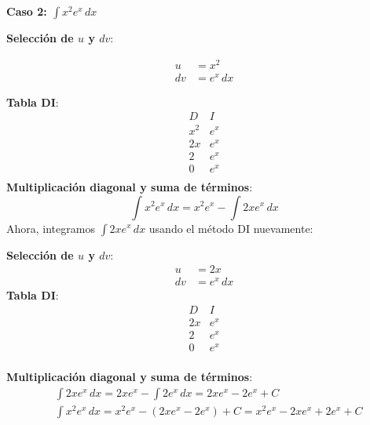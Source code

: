 \begin{example}
    \textbf{Caso 2: \( \int x^2 e^x \, dx \)}
    
    \textbf{Selección de \( u \) y \( dv \)}:
    
    \begin{align*}
    u &= x^2 \\
    dv &= e^x \, dx
    \end{align*}
    
    \textbf{Tabla DI}:
\begin{equation*}
    \begin{array}{c|c}
        D & I \\
        \hline
        x^2 & e^x \\
        2x & e^x \\
        2 & e^x \\
        0 & e^x \\
        \end{array}
\end{equation*}
    \textbf{Multiplicación diagonal y suma de términos}:
\begin{equation*}
    \int x^2 e^x \, dx = x^2 e^x - \int 2x e^x \, dx
\end{equation*}
Ahora, integramos \( \int 2x e^x \, dx \) usando el método DI nuevamente:
    
    \textbf{Selección de \( u \) y \( dv \)}:
    \begin{align*}
    u &= 2x \\
    dv &= e^x \, dx
    \end{align*}
    \textbf{Tabla DI}:
\begin{equation*}
    \begin{array}{c|c}
        D & I \\
        \hline
        2x & e^x \\
        2 & e^x \\
        0 & e^x \\
        \end{array}
\end{equation*}
    
    \textbf{Multiplicación diagonal y suma de términos}:
\begin{align*}
    &\int 2x e^x \, dx = 2x e^x - \int 2 e^x \, dx = 2x e^x - 2e^x + C\\
    &\int x^2 e^x \, dx = x^2 e^x - (2x e^x - 2e^x) + C = x^2 e^x - 2x e^x + 2e^x + C
\end{align*}
\end{example}    

